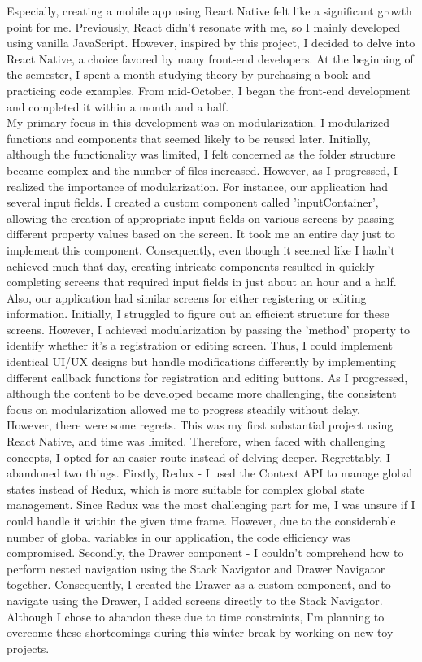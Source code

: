 \documentclass[conference]{IEEEtran}
\begin{document}
Especially, creating a mobile app using React Native felt like a significant growth point for me. Previously, React didn't resonate with me, so I mainly developed using vanilla JavaScript. However, inspired by this project, I decided to delve into React Native, a choice favored by many front-end developers. At the beginning of the semester, I spent a month studying theory by purchasing a book and practicing code examples. From mid-October, I began the front-end development and completed it within a month and a half.\\

My primary focus in this development was on modularization. I modularized functions and components that seemed likely to be reused later. Initially, although the functionality was limited, I felt concerned as the folder structure became complex and the number of files increased. However, as I progressed, I realized the importance of modularization. For instance, our application had several input fields. I created a custom component called 'inputContainer', allowing the creation of appropriate input fields on various screens by passing different property values based on the screen. It took me an entire day just to implement this component. Consequently, even though it seemed like I hadn't achieved much that day, creating intricate components resulted in quickly completing screens that required input fields in just about an hour and a half. Also, our application had similar screens for either registering or editing information. Initially, I struggled to figure out an efficient structure for these screens. However, I achieved modularization by passing the 'method' property to identify whether it's a registration or editing screen. Thus, I could implement identical UI/UX designs but handle modifications differently by implementing different callback functions for registration and editing buttons. As I progressed, although the content to be developed became more challenging, the consistent focus on modularization allowed me to progress steadily without delay.\\

However, there were some regrets. This was my first substantial project using React Native, and time was limited. Therefore, when faced with challenging concepts, I opted for an easier route instead of delving deeper. Regrettably, I abandoned two things. Firstly, Redux - I used the Context API to manage global states instead of Redux, which is more suitable for complex global state management. Since Redux was the most challenging part for me, I was unsure if I could handle it within the given time frame. However, due to the considerable number of global variables in our application, the code efficiency was compromised. Secondly, the Drawer component - I couldn't comprehend how to perform nested navigation using the Stack Navigator and Drawer Navigator together. Consequently, I created the Drawer as a custom component, and to navigate using the Drawer, I added screens directly to the Stack Navigator. Although I chose to abandon these due to time constraints, I'm planning to overcome these shortcomings during this winter break by working on new toy-projects.\\
\end{document}
